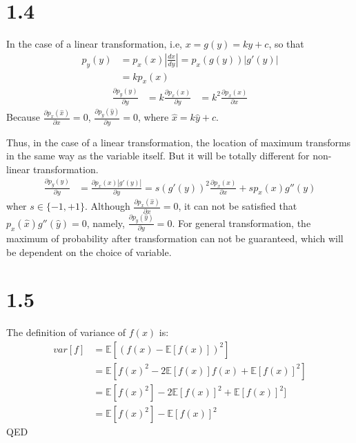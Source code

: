 \documentclass[10pt,a4paper,draft]{book}
\begin{document}
\section*{1.4}
In the case of a linear transformation, i.e, $x = g(y) = k y + c$, so that 
\begin{equation}
\begin{aligned}
p_y(y) &= p_x(x) \left|\frac{dx}{dy}\right| = p_x(g(y))|g'(y)| \\
&= k p_x(x)
\end{aligned}
\end{equation}
\begin{equation}
\begin{aligned}
\frac{\partial p_y(y)}{\partial y}&= k \frac{\partial p_x(x)}{\partial y}
&= k^2 \frac{\partial p_x(x)}{\partial x}
\end{aligned}
\end{equation}
Because $\frac{\partial p_x(\hat{x})}{\partial x} = 0$, $\frac{\partial p_y(\hat{y})}{\partial y} = 0$, where $\hat{x} = k \hat{y} + c$. 

Thus, in the case of a linear transformation, the location of maximum transforms in the same way as the variable itself. But it will be totally different for non-linear transformation. 
\begin{equation}
\begin{aligned}
\frac{\partial p_y(y)}{\partial y}&= \frac{\partial p_x(x)|g'(y)|}{\partial y}
=s (g'(y))^2 \frac{\partial p_x(x) }{\partial x} + s p_x(x) g''(y)
\end{aligned}
\end{equation}
wher $s \in \{-1,+1\}$. Although $\frac{\partial p_x(\hat{x})}{\partial x} = 0$, it can not be satisfied that $p_x(\hat{x}) g''(\hat{y})=0$, namely, $\frac{\partial p_y(\hat{y})}{\partial y} = 0$. For general transformation, the maximum of probability after transformation can not be guaranteed, which will be dependent on the choice of variable.

\section*{1.5}
The definition of variance of $f(x)$ is:
\begin{equation}
\begin{aligned}
var[f] &= \mathbb{E}[(f(x)-\mathbb{E}[f(x)])^2] \\
&= \mathbb{E}[f(x)^2-2\mathbb{E}[f(x)]f(x)+ \mathbb{E}[f(x)]^2] \\
&= \mathbb{E}[f(x)^2]-2\mathbb{E}[f(x)]^2 + \mathbb{E}[f(x)]^2] \\
&= \mathbb{E}[f(x)^2]-\mathbb{E}[f(x)]^2
\end{aligned}
\end{equation}
QED
\end{document}
